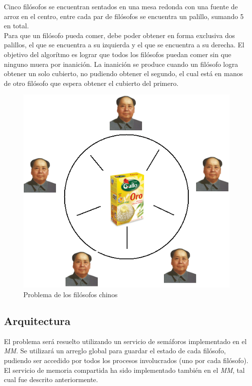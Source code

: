 Cinco filósofos se encuentran sentados en una mesa redonda con una fuente de arroz en el centro, entre cada 
par de filósofos se encuentra un palillo, sumando 5 en total. \\
Para que un filósofo pueda comer, debe poder obtener en forma exclusiva dos palillos, el que se encuentra 
a su izquierda y el que se encuentra a su derecha. El objetivo del algorítmo es lograr que todos los 
filósofos puedan comer sin que ninguno muera por inanición. La inanici\'on se produce cuando un filósofo logra obtener 
un solo cubierto, no pudiendo obtener el segundo, el cual está en manos de otro filósofo que espera obtener 
el cubierto del primero.

\begin{figure}[!h]
	\centering
	\includegraphics[scale=0.4]{secciones/imagenes/chinos.png}
	\caption{Problema de los fil\'osofos chinos}
	\label{fig:filosofos}
\end{figure}

\subsection{Arquitectura}
El problema será resuelto utilizando un servicio de semáforos implementado en el \emph{MM}.  Se utilizará 
un arreglo global para guardar el estado de cada filósofo, pudiendo ser accedido por todos los procesos involucrados 
(uno por cada filósofo).  El servicio de memoria compartida ha sido implementado también en el \emph{MM},
tal cual fue descrito anteriormente.
